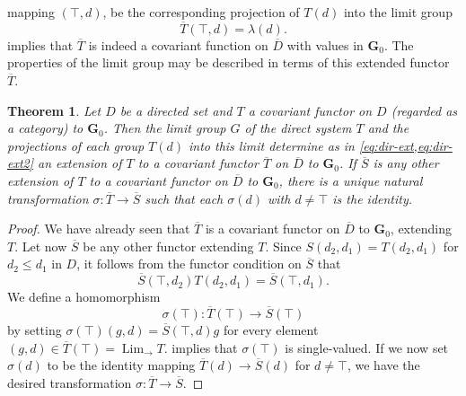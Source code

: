 \documentclass[11pt,a4paper]{report}
\newtheorem{theorem}{Theorem}
\DeclareMathOperator{\Lim}{Lim}
\begin{document}
mapping $(\top,d)$, be the corresponding projection of $T(d)$ into the limit group
\begin{equation}\label{eq:dir-ext2}
	\overline{T}(\top,d)=\lambda(d).
\end{equation}
 implies that $\overline{T}$ is indeed a covariant function on $\overline{D}$ with values in $\mathbf{G}_0$. The properties of
the limit group may be described in terms of this extended functor $\overline{T}$.
\begin{theorem}\label{thm:dir-uniq}
	Let $D$ be a directed set and $T$ a covariant functor on $D$ (regarded as a category) to $\mathbf{G}_0$. Then the limit group $G$
	of the direct system $T$ and the projections of each group $T(d)$ into this limit determine as in \cref{eq:dir-ext,eq:dir-ext2}
	an extension of $T$ to a covariant functor $\overline{T}$ on $\overline{D}$ to $\mathbf{G}_0$. If $\overline{S}$ is any other
	extension of $T$ to a covariant functor on $\overline{D}$ to $\mathbf{G}_0$, there is a unique natural transformation
	$\sigma:\overline{T}\rightarrow\overline{S}$ such that each $\sigma(d)$ with $d\ne\top$ is the identity.
\end{theorem}
\begin{proof}
	We have already seen that $\overline{T}$ is a covariant functor on $\overline{D}$ to $\mathbf{G}_0$, extending $T$. Let now
	$\overline{S}$ be any other functor extending $T$. Since $S(d_2,d_1)=T(d_2,d_1)$ for $d_2\le d_1$ in $D$, it follows from 
	the functor condition on $\overline{S}$ that
	\begin{equation}\label{eq:dir-uniq}
		\overline{S}(\top,d_2)T(d_2,d_1) = \overline{S}(\top,d_1).
	\end{equation}
	We define a homomorphism
	\begin{equation*}
		\sigma(\top):\overline{T}(\top)\rightarrow\overline{S}(\top)
	\end{equation*}
	by setting  $\sigma(\top)(g,d)=\overline{S}(\top,d)g$ for every element $(g,d)\in\overline{T}(\top)=\Lim_{\rightarrow} T$.
	 implies that $\sigma(\top)$ is single\hyp{}valued. If we now set $\sigma(d)$ to be the identity mapping
	$\overline{T}(d)\rightarrow\overline{S}(d)$ for $d\ne\top$, we have the desired transformation $\sigma:\overline{T}\rightarrow\overline{S}$.
\end{proof}
\end{document}
